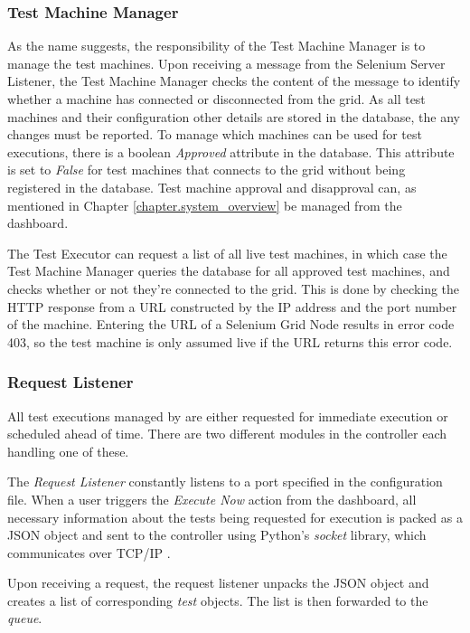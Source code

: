 \subsubsection{Test Machine Manager}

As the name suggests, the responsibility of the Test Machine Manager is to manage the test machines. Upon receiving a message from the Selenium Server Listener, the Test Machine Manager checks the content of the message to identify whether a machine has connected or disconnected from the grid. As all test machines and their configuration other details are stored in the database, the any changes must be reported. To manage which machines can be used for test executions, there is a boolean \emph{Approved} attribute in the database. This attribute is set to \emph{False} for test machines that connects to the grid without being registered in the database. Test machine approval and disapproval can, as mentioned in Chapter \ref{chapter.system_overview} be managed from the dashboard.

The Test Executor can request a list of all live test machines, in which case the Test Machine Manager queries the database for all approved test machines, and checks whether or not they're connected to the grid. This is done by checking the HTTP response from a URL constructed by the IP address and the port number of the machine. Entering the URL of a Selenium Grid Node results in error code 403, so the test machine is only assumed live if the URL returns this error code.

\subsubsection{Request Listener}

All test executions managed by \toolname \space are either requested for immediate execution or scheduled ahead of time. There are two different modules in the controller each handling one of these.

The \emph{Request Listener} constantly listens to a port specified in the configuration file. When a user triggers the \emph{Execute Now} action from the dashboard, all necessary information about the tests being requested for execution is packed as a JSON object and sent to the controller using Python's \emph{socket} library, which communicates over TCP/IP \cite{https://docs.python.org/3/library/socket.html / https://docs.python.org/3/library/socket.html}.

Upon receiving a request, the request listener unpacks the JSON object and creates a list of corresponding \emph{test} objects. The list is then forwarded to the \emph{queue}.


